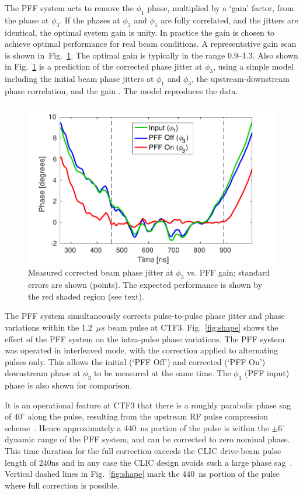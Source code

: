 \documentclass[%
 reprint,
 superscriptaddress,
 amsmath,
 amssymb,
 prl,
]{revtex4-1}
\begin{document}
The PFF system acts to remove the \(\phi_1\) phase, multiplied by a `gain' 
factor, from the phase at \(\phi_3\). If the phases at \(\phi_3\) and 
\(\phi_1\) are fully correlated, and the jitters are identical, the optimal 
system gain is unity.
In practice the gain is chosen to achieve optimal 
performance for real beam conditions. A representative gain scan is shown 
in~Fig.~\ref{fig:gScan}. The optimal gain is typically in the range 
0.9--1.3. Also shown in Fig.~\ref{fig:gScan} is a prediction of 
the corrected phase jitter at \(\phi_3\), using a simple model including the 
initial beam phase jitters at \(\phi_1\) and 
\(\phi_3\), the upstream-downstream phase correlation, and the gain 
\cite{RobertsThesis}. The model reproduces the data.

\begin{figure}
\includegraphics[width=\columnwidth]{toSubmit/fig5}
\caption{\label{fig:gScan}Measured corrected beam  phase jitter at \(\phi_3\) 
vs. PFF gain; standard errors are shown (points). The expected 
performance is shown by the red shaded region (see text).}
\end{figure}

The PFF system simultaneously corrects pulse-to-pulse phase jitter and phase 
variations within the 1.2~\(\mu s\) beam pulse at CTF3. 
Fig.~\ref{fig:shape} shows the effect of the PFF system on the intra-pulse 
phase variations. The PFF system was operated in interleaved mode, with 
the correction applied to alternating pulses only. This allows 
the initial (`PFF Off') and corrected (`PFF On') downstream phase at \(\phi_3\)
to be measured at the same time. The \(\phi_1\) (PFF input) phase 
is also shown for comparison. 

It is an operational feature at CTF3 that there is a roughly parabolic phase 
sag of \(40^\circ\) along the pulse, resulting from the upstream RF pulse 
compression 
scheme~\cite{CLICCDR}. Hence approximately a 440~ns portion of the pulse is 
within the \(\pm 6^\circ\) dynamic range of the PFF system, and can be 
corrected to zero nominal phase. 
This time duration for the full correction exceeds the CLIC drive-beam pulse 
length of 240ns and in any case the CLIC design avoids such 
a large phase sag~\cite{CLICCDR}. 
Vertical dashed lines in Fig.~\ref{fig:shape} mark the 440~ns portion of 
the pulse where full correction is possible.
\end{document}
